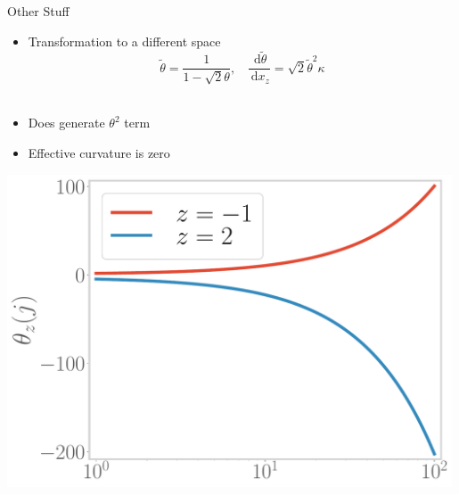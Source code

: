 \documentclass[12pt,aspectratio=169]{beamer}
\begin{document}
\begin{frame}{Other Stuff}

\begin{minipage}{0.5\textwidth}
\begin{itemize}
\item Transformation to a different space
	\[ \tilde\theta = \frac{1}{1 - \sqrt 2 \theta}, ~ ~ ~ ~\frac{\:\mathrm{d}\tilde\theta}{\:\mathrm{d}x_z} = \sqrt 2 \tilde\theta^2 \kappa \]\\[5pt]
\item Does generate \(\theta^2\) term\\[10pt]
\item Effective curvature is zero
\end{itemize}
\end{minipage}
\begin{minipage}{0.49\textwidth}
\includegraphics[width=0.99\textwidth]{figures/thetap.pdf}
\end{minipage}
\end{frame}
\end{document}
